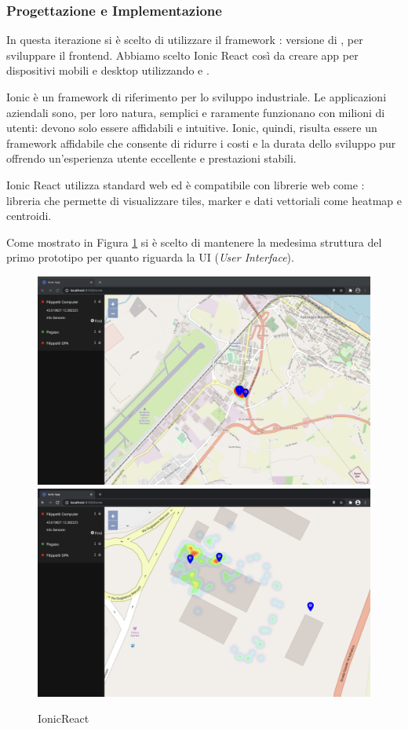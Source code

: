 \documentclass[a4paper]{report}
\begin{document}
\subsubsection*{{Progettazione e Implementazione}}
In questa iterazione si è scelto di utilizzare il framework \cite*{IonicReact}: versione \cite*{React} di \cite*{Ionic}, per sviluppare il frontend. Abbiamo scelto Ionic React così da creare app per dispositivi mobili e desktop utilizzando \cite*{Capacitor} e \cite*{Electron}. 

Ionic è un framework di riferimento per lo sviluppo industriale. Le applicazioni aziendali sono, per loro natura, semplici e raramente funzionano con milioni di utenti: devono solo essere affidabili e intuitive. Ionic, quindi, risulta essere un framework affidabile che consente di ridurre i costi e la durata dello sviluppo pur offrendo un'esperienza utente eccellente e prestazioni stabili. \cite*{IonicReactArticle}

Ionic React utilizza standard web ed è compatibile con librerie web come \cite*{OpenLayers}: libreria che permette di visualizzare tiles, marker e dati vettoriali come heatmap e centroidi. 

Come mostrato in Figura \ref{IonicReact_2iterazione} si è scelto di mantenere la medesima struttura del primo prototipo per quanto riguarda la UI (\textit{User Interface}).
\begin{figure}[tbp]
    \centering
    \includegraphics[width=.7\textwidth]{figure/ionicreact_2iterazione_large.png}\hfill
    \includegraphics[width=.7\textwidth]{figure/ionicreact_2iterazione_small.png}\hfill

    \caption{IonicReact}
    \label{IonicReact_2iterazione}
\end{figure}
\end{document}
